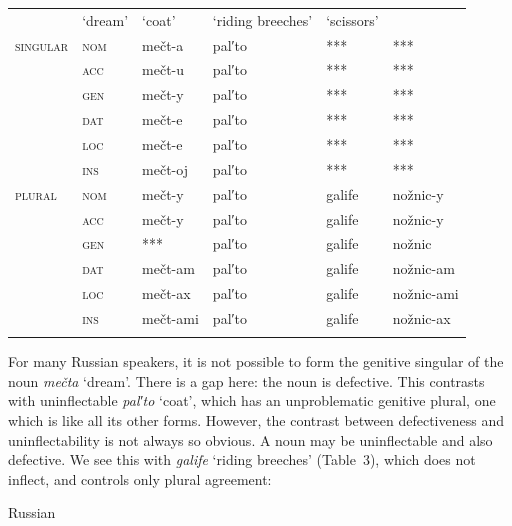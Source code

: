 \documentclass[output=paper]{langscibook}
\begin{document}
\begin{tabularx}{\textwidth}{XXXXXX}

\lsptoprule
\multicolumn{2}{c}{} & ‘dream’ & ‘coat’ & ‘riding breeches’ & ‘scissors’\\
 \textsc{singular} & \textsc{nom} & mečt-a & pal′to & *** & ***\\
& \textsc{acc} & mečt-u & pal′to & *** & ***\\
& \textsc{gen} & mečt-y & pal′to & *** & ***\\
& \textsc{dat} & mečt-e & pal′to & *** & ***\\
& \textsc{loc} & mečt-e & pal′to & *** & ***\\
& \textsc{ins} & mečt-oj & pal′to & *** & ***\\
 \textsc{plural} & \textsc{nom} & mečt-y & pal′to & galife & nožnic-y\\
& \textsc{acc} & mečt-y & pal′to & galife & nožnic-y\\
& \textsc{gen} & *** & pal′to & galife & nožnic\\
& \textsc{dat} & mečt-am & pal′to & galife & nožnic-am\\
& \textsc{loc} & mečt-ax & pal′to & galife & nožnic-ami\\
& \textsc{ins} & mečt-ami & pal′to & galife & nožnic-ax\\
\lspbottomrule
\end{tabularx}
\begin{table}
\caption{Defectiveness and uninflectability illustrated from Russian}
\label{tab:key:3}
\end{table}

For many Russian speakers, it is not possible to form the genitive singular of the noun \textit{mečta} ‘dream’. There is a gap here: the noun is defective. This contrasts with uninflectable \textit{pal′to} ‘coat’, which has an unproblematic genitive plural, one which is like all its other forms. However, the contrast between defectiveness and uninflectability is not always so obvious. A noun may be uninflectable and also defective. We see this with \textit{galife} ‘riding breeches’ (Table~3), which does not inflect, and controls only plural agreement:

Russian \citep[60]{Corbett2019}

\ea%
    \label{ex:key:4}
    \gll \\
         \\
    \glt
    \z %
\end{document}
